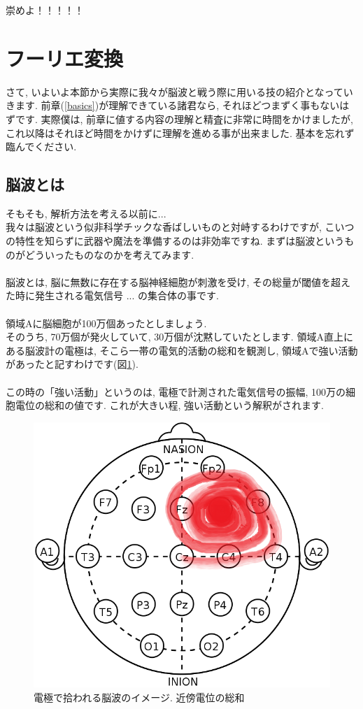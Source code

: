 \documentclass[11pt,a4paper]{jreport}
\begin{document}
崇めよ！！！！！\\

\section{フーリエ変換}
さて, いよいよ本節から実際に我々が脳波と戦う際に用いる技の紹介となっていきます. 前章(\ref{basics})が理解できている諸君なら, それほどつまずく事もないはずです. 実際僕は, 前章に値する内容の理解と精査に非常に時間をかけましたが, これ以降はそれほど時間をかけずに理解を進める事が出来ました. 基本を忘れず臨んでください.
\subsection{脳波とは}
そもそも, 解析方法を考える以前に...\\
我々は脳波という似非科学チックな香ばしいものと対峙するわけですが, こいつの特性を知らずに武器や魔法を準備するのは非効率ですね. まずは脳波というものがどういったものなのかを考えてみます. \\
\\
脳波とは, 脳に無数に存在する脳神経細胞が刺激を受け, その総量が閾値を超えた時に発生される電気信号 ... の集合体の事です.\\
\\
領域Aに脳細胞が100万個あったとしましょう. \\
そのうち, 70万個が発火していて, 30万個が沈黙していたとします. 領域A直上にある脳波計の電極は, そこら一帯の電気的活動の総和を観測し, 領域Aで強い活動があったと記すわけです(図\ref{im:topo}).\\
\\
この時の「強い活動」というのは, 電極で計測された電気信号の振幅, 100万の細胞電位の総和の値です. これが大きい程, 強い活動という解釈がされます.\\

\begin{figure}[H]
\label{im:topo}
  \centering
  \includegraphics[width=120mm,bb=0 0 673 602]{figures/topomap.png}
  \caption{電極で拾われる脳波のイメージ. 近傍電位の総和}
\end{figure}
\end{document}
